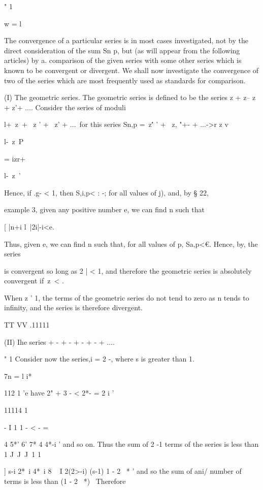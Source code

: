 " 1

w = l

The convergence of a particular series is in most cases investigated,
not by the direct consideration of the sum Sn p, but (as will appear
from the following articles) by a. comparison of the given series with
some other series which is known to be convergent or divergent. We
shall now investigate the convergence of two of the series which are
most frequently used as standards for comparison.

%
%

(I) The geometric series. The geometric series is defined to be the
series z + z-- z + z'+ .... Consider the series of moduli

l+\ z\ + \ z ' + \ z' + ...\ for this series Sn,p =\ z\'' ' + \ z, "+-
+ ...->r z v

l-\ z\ P

= izr+

l-\ z\ '

Hence, if .g- < 1, then S,i,p< : -; for all values of j), and, by §
22,

example 3, given any positive number e, we can find n such that

[ |n+i l\ |2i|-i<e.

Thus, given e, we can find n such that, for all values of p, Sa,p<€.
Hence, by, the series

is convergent so long as 2 | < 1, and therefore the geometric series
is absolutely convergent if\ z\ < .

When z ' 1, the terms of the geometric series do not tend to zero as n
tends to infinity, and the series is therefore divergent.

TT VV .11111

(II) Ihe series + - + - + - + - + ....

" 1 Consider now the series,i = 2 -, where s is greater than 1.

7n = l i*

112 1 'e have 2" + 3 - < 2*- = 2 i '

11114 1

- I 1 1 - < - =

4 5*' 6' 7* 4 4*-i ' and so on. Thus the sum of 2 -1 terms of the
series is less than 1 J\ J\ J\ 1 1

] s-i 2*~i 4*~i 8 ~  I 2(2>-i) (s-1) 1 - 2 ~* ' and so the sum of
ani/ number of terms is less than (1 - 2 ~*)~ Therefore

